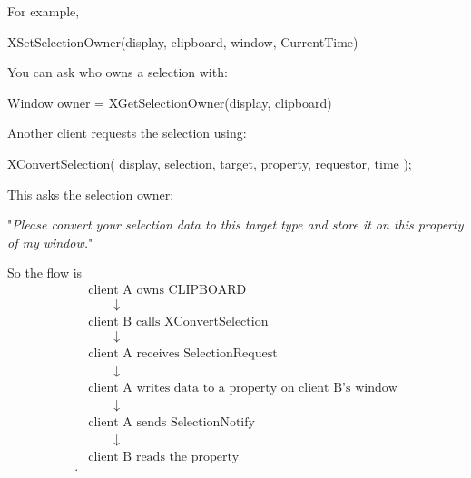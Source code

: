 \documentclass{report}
\begin{document}
\begin{itemize}
\begin{cppcode}
            \end{cppcode}
            \bigbreak \noindent 
            For example,
            \bigbreak \noindent 
            \begin{cppcode}
                XSetSelectionOwner(display, clipboard, window, CurrentTime)
            \end{cppcode}
            \bigbreak \noindent 
            You can ask who owns a selection with:
            \bigbreak \noindent
            \begin{cppcode}
            Window owner = XGetSelectionOwner(display, clipboard) 
            \end{cppcode}
            \bigbreak \noindent 
            Another client requests the selection using:
            \bigbreak \noindent 
            \begin{cppcode}
                XConvertSelection(
                    display,
                    selection,
                    target,
                    property,
                    requestor,
                    time
                );
            \end{cppcode}
            \bigbreak \noindent 
            This asks the selection owner:
            \begin{center}
                "\textit{Please convert your selection data to this target type and store it on this property of my window.}"
            \end{center}
            So the flow is
            \begin{align*}
                &\text{client A owns CLIPBOARD} \\
                &\qquad\downarrow \\
                &\text{client B calls XConvertSelection }\\
                &\qquad\downarrow \\
                &\text{client A receives SelectionRequest }\\
                &\qquad\downarrow\\
                &\text{client A writes data to a property on client B's window}\\
                &\qquad\downarrow\\
                &\text{client A sends SelectionNotify}\\
                &\qquad\downarrow\\
                &\text{client B reads the property}\\
            .\end{align*}

\end{itemize}
\end{document}
